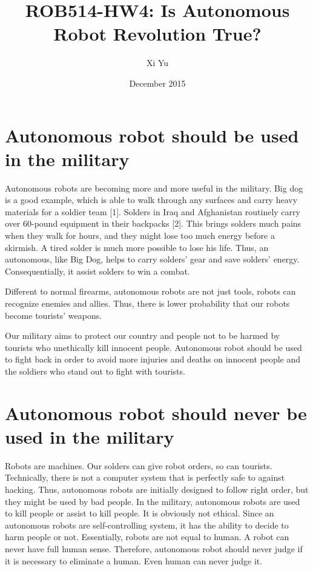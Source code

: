 \documentclass[letterpaper, 12 pt, conference]{ieeeconf}
\title{\LARGE \bf
ROB514-HW4: Is Autonomous Robot Revolution True?}
\author{Xi Yu}
\date{December 2015}
\begin{document}
\maketitle

\section{Autonomous robot should be used in the military}
Autonomous robots are becoming more and more useful in the military. Big dog is a good example, which is able to walk through any surfaces and carry heavy materials for a soldier team [1]. Solders in Iraq and Afghanistan routinely carry over 60-pound equipment in their backpacks [2]. This brings solders much pains when they walk for hours, and they might lose too much energy before a skirmish. A tired solder is much more possible to lose his life. Thus, an autonomous, like Big Dog, helps to carry solders’ gear and save solders’ energy. Consequentially, it assist solders to win a combat. 

Different to normal firearms, autonomous robots are not just tools, robots can recognize enemies and allies. Thus, there is lower probability that our robots become tourists’ weapons. 

Our military aims to protect our country and people not to be harmed by tourists who unethically kill innocent people. Autonomous robot should be used to fight back in order to avoid more injuries and deaths on innocent people and the soldiers who stand out to fight with tourists.

\section{Autonomous robot should never be used in the military}
Robots are machines. Our solders can give robot orders, so can tourists. Technically, there is not a computer system that is perfectly safe to against hacking. Thus, autonomous robots are initially designed to follow right order, but they might be used by bad people. In the military, autonomous robots are used to kill people or assist to kill people. It is obviously not ethical. Since an autonomous robots are self-controlling system, it has the ability to decide to harm people or not. Essentially, robots are not equal to human. A robot can never have full human sense. Therefore, autonomous robot should never judge if it is necessary to eliminate a human. Even human can never judge it. 
\end{document}

